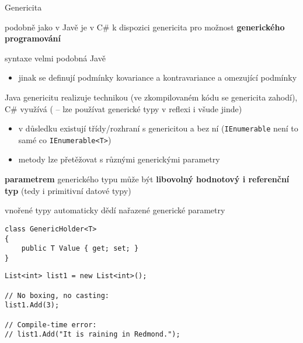 
\begin{frame}[fragile]
\begin{bitemize}{Genericita}
\item podobně jako v Javě je v C\# k dispozici genericita pro možnost \textbf{generického programování}
\item syntaxe velmi podobná Javě
\begin{itemize}
\item jinak se definují podmínky kovariance a kontravariance a omezující podmínky
\end{itemize}

\item Java genericitu realizuje technikou  (ve zkompilovaném kódu se genericita zahodí), C\# využívá  ( -- lze používat generické typy v reflexi i všude jinde)
\begin{itemize}
\item v důsledku existují třídy/rozhraní s genericitou a bez ní (\lstinline|IEnumerable| není to samé co \lstinline|IEnumerable<T>|)
\item metody lze přetěžovat s různými generickými parametry
\end{itemize}
\item \textbf{parametrem} generického typu může být \textbf{libovolný hodnotový i referenční typ} (tedy i primitivní datové typy)
\item vnořené typy automaticky dědí nařazené generické parametry
\end{bitemize}
\vfill


\end{frame}


\begin{frame}[fragile]
\begin{yesblock}
\begin{lstlisting}
class GenericHolder<T>
{
    public T Value { get; set; }
}
\end{lstlisting}
\end{yesblock}
\vfill
\begin{yesblock}
\begin{lstlisting}
List<int> list1 = new List<int>();

// No boxing, no casting:
list1.Add(3);

// Compile-time error:
// list1.Add("It is raining in Redmond.");
\end{lstlisting}
\end{yesblock}
\end{frame}